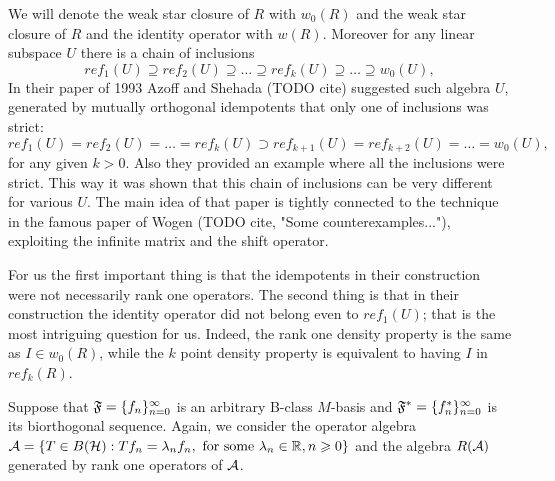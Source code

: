 \documentclass[12pt]{amsart}
\theoremstyle{case}
\begin{document}
  We will denote the weak star closure of $R$ with $w_0(R)$ and the weak star closure of $R$ and the identity operator with $w(R)$.
  Moreover for any linear subspace $U$ there is a chain of inclusions
  \[
    ref_1(U) \supseteq ref_2(U) \supseteq \dots \supseteq ref_k(U) \supseteq \dots \supseteq w_0(U),
  \]
  In their paper of 1993 Azoff and Shehada (TODO cite) suggested such algebra $U$, generated by
    mutually orthogonal idempotents that only one of inclusions was strict:
  \[
    ref_1(U) = ref_2(U) = \dots = ref_k(U) \supset ref_{k + 1}(U) = ref_{k+2}(U) = \dots = w_0(U),
  \]
    for any given $k > 0$.
  Also they provided an example where all the inclusions were strict.
  This way it was shown that this chain of inclusions can be very different for various $U$.
  The main idea of that paper is tightly connected to the technique in the famous paper of Wogen (TODO cite, "Some counterexamples..."),
    exploiting the infinite matrix and the shift operator.

  For us the first important thing is that the idempotents in their construction were not necessarily rank one operators.
  The second thing is that in their construction the identity operator did not belong even to $ref_1(U)$;
    that is the most intriguing question for us.
  Indeed, the rank one density property is the same as $I \in w_0(R)$,
    while the $k$ point density property is equivalent to having $I$ in $ref_k(R)$.

  Suppose that $\fsys=\{f_n\}_{n=0}^\infty$ is an arbitrary B-class $M$-basis and
    $\fstarsys = \{f^*_n\}_{n=0}^\infty$ is its biorthogonal sequence.
  Again, we consider the operator algebra $\cal{A} = \{T\in B(\cal{H}): Tf_n = \lambda_n f_n,
    \text{ for some } \lambda_n \in \mathbb{R}, n \geq 0\}$
    and the algebra $R(\cal{A})$ generated by rank one operators of $\cal{A}$.
\end{document}
